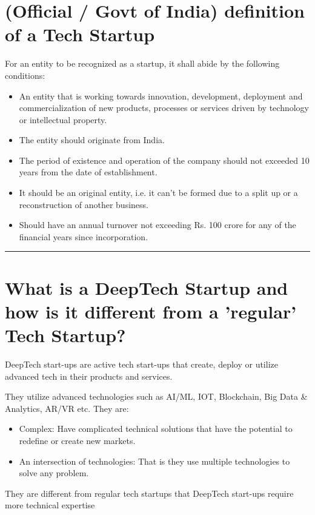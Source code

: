 \documentclass[a4paper]{article}
\begin{document}


\section{(Official / Govt of India) definition of a Tech Startup}

\large{For an entity to be recognized as a startup, it shall abide by the following conditions:
\begin{itemize}
    \item An entity that is working towards innovation, development, deployment and commercialization of new products, processes or services driven by technology or intellectual property.
    \item The entity should originate from India.
    \item The period of existence and operation of the company should not exceeded 10 years from the date of establishment.
    \item It should be an original entity, i.e. it can't be formed due to a split up or a reconstruction of another business. \cite{startupindia}
    \item Should have an annual turnover not exceeding Rs. 100 crore for any of the financial years since incorporation. \cite{startupindia}
\end{itemize}
}

\rule{\textwidth}{0.4pt}

\section{What is a DeepTech Startup and how is it different from a 'regular' Tech Startup?}

\large{DeepTech start-ups are active tech start-ups that create, deploy or utilize advanced tech in their products and services.}

\large {They utilize advanced technologies such as AI/ML, IOT, Blockchain, Big Data \& Analytics, AR/VR etc.
They are:
\begin{itemize}
    \item Complex: Have complicated technical solutions that have the potential to redefine or create new markets.
    \item An intersection of technologies: That is they use multiple technologies to solve any problem.
\end{itemize}

They are different from regular tech startups that DeepTech start-ups require more technical expertise
}
\end{document}
